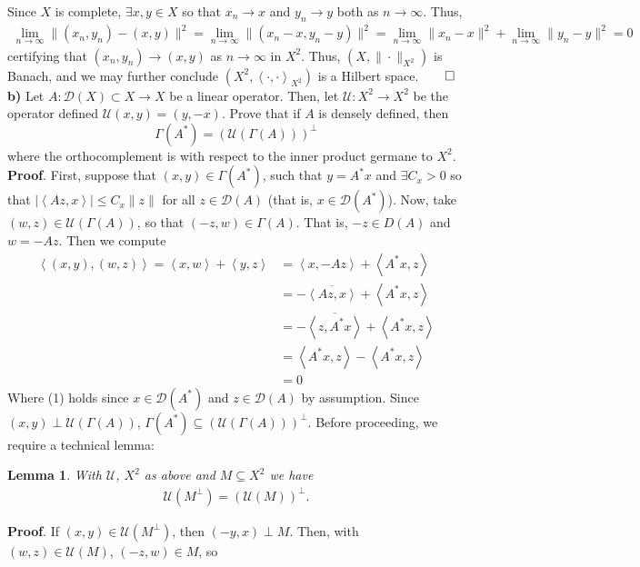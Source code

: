 \documentclass[10pt]{article}
\newcommand{\1}[1]{\mathbbm{1}_{#1}} \newcommand{\mc}[1]{\mathcal{#1}}
\newcommand{\ip}[2]{\left\langle#1,#2\right\rangle }
\newtheorem{lemma}{Lemma}
\begin{document}
    Since $X$ is complete, $\exists x,y\in X$ so that $x_n\rightarrow x$ and $y_n\rightarrow y$ both as $n\rightarrow\infty$. Thus,
    \begin{align*}
        \lim_{n\rightarrow\infty}\|(x_n,y_n)-(x,y)\|^2=\lim_{n\rightarrow\infty}\|(x_n-x,y_n-y)\|^2=\lim_{n\rightarrow\infty}\|x_n-x\|^2+\lim_{n\rightarrow\infty}\|y_n-y\|^2=0
    \end{align*}
    certifying that $(x_n,y_n)\rightarrow(x,y)$ as $n\rightarrow\infty$ in $X^2$. Thus, $(X,\|\cdot\|_{X^2})$ is Banach, and we may further conclude $(X^2,\ip{\cdot}{\cdot}_{X^2})$ is a Hilbert space.\hfill{$\qed$}\\[5pt]
    {\bf b)} Let $A:\mc{D}(X)\subset X\rightarrow X$ be a linear operator. Then, let $\mc{U}:X^2\rightarrow X^2$ be the operator defined $\mc{U}(x,y)=(y,-x)$. Prove that if $A$ is densely defined, then
    \[\Gamma(A^\ast)=(\mc{U}(\Gamma(A)))^\perp\]
    where the orthocomplement is with respect to the inner product germane to $X^2$.\\[5pt]
    {\bf Proof}. First, suppose that $(x,y)\in\Gamma(A^\ast)$, such that $y=A^\ast x$ and $\exists C_x>0$ so that $|\ip{Az}{x}|\leq C_x\|z\|$ for all $z\in\mc{D}(A)$ (that is, $x\in \mc{D}(A^\ast)$).
    Now, take $(w,z)\in\mc{U}(\Gamma(A))$, so that $(-z,w)\in\Gamma(A)$. That is, $-z\in D(A)$ and $w=-Az$. Then we compute
    \begin{align*}
        \ip{(x,y)}{(w,z)}=\ip{x}{w}+\ip{y}{z}&=\ip{x}{-Az}+\ip{A^\ast x}{z}\\
        &=-\overline{\ip{Az}{x}}+\ip{A^\ast x}{z}\\
        &=-\overline{\ip{z}{A^\ast x}}+\ip{A^\ast x}{z}\tag{1}\\
        &=\ip{A^\ast x}{z}-\ip{A^\ast x}{z}\\
        &=0
    \end{align*}
    Where (1) holds since $x\in\mc{D}(A^\ast)$ and $z\in\mc{D}(A)$ by assumption. Since $(x,y)\perp \mc{U}(\Gamma(A))$, $\Gamma(A^\ast)\subseteq(\mc{U}(\Gamma(A)))^\perp$.
    Before proceeding, we require a technical lemma:
    \begin{lemma}\label{lem1}
        With $\mc{U}$, $X^2$ as above and $M\subseteq X^2$ we have
        \begin{align*}
            \mc{U}(M^\perp)=(\mc{U}(M))^\perp.
        \end{align*}
    \end{lemma}
    {\bf Proof}. If $(x,y)\in\mc{U}(M^\perp)$, then $(-y,x)\perp M$. Then, with $(w,z)\in\mc{U}(M)$, $(-z,w)\in M$, so 
\end{document}
